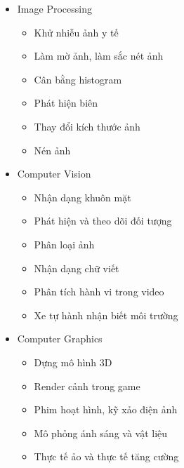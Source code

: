 \begin{itemize}
	\item Image Processing
	
	\begin{itemize}
		\item Khử nhiễu ảnh y tế
		
		\item Làm mờ ảnh, làm sắc nét ảnh
		
		\item Cân bằng histogram
		
		\item Phát hiện biên
		
		\item Thay đổi kích thước ảnh
		
		\item Nén ảnh
	\end{itemize}
	
	\item Computer Vision
	
	\begin{itemize}
		\item Nhận dạng khuôn mặt
		
		\item Phát hiện và theo dõi đối tượng
		
		\item Phân loại ảnh
		
		\item Nhận dạng chữ viết
		
		\item Phân tích hành vi trong video
		
		\item Xe tự hành nhận biết môi trường
	\end{itemize}
	
	\item Computer Graphics
	
	\begin{itemize}
		\item Dựng mô hình 3D
		
		\item Render cảnh trong game
		
		\item Phim hoạt hình, kỹ xảo điện ảnh
		
		\item Mô phỏng ánh sáng và vật liệu
		
		\item Thực tế ảo và thực tế tăng cường
	\end{itemize}
\end{itemize}

